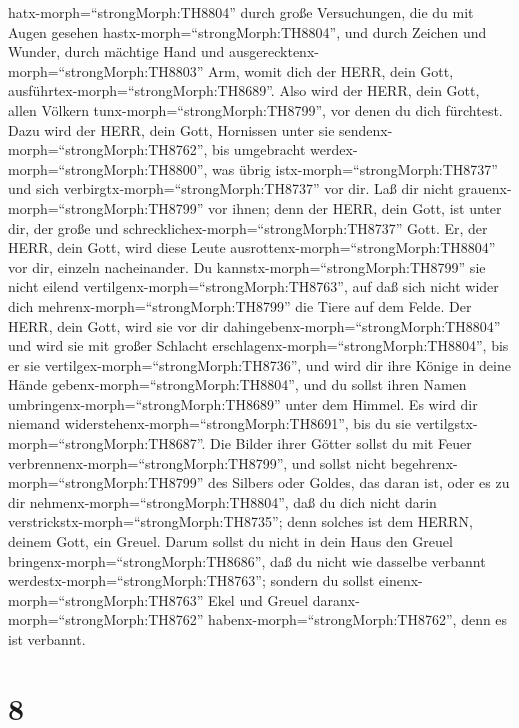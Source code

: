 hatx-morph=``strongMorph:TH8804''  durch große
Versuchungen, die du mit Augen gesehen
hastx-morph=``strongMorph:TH8804'', und durch Zeichen und Wunder, durch
mächtige Hand und ausgerecktenx-morph=``strongMorph:TH8803'' Arm, womit
dich der HERR, dein Gott, ausführtex-morph=``strongMorph:TH8689''. Also
wird der HERR, dein Gott, allen Völkern
tunx-morph=``strongMorph:TH8799'', vor denen du dich fürchtest.
 Dazu wird der HERR, dein Gott, Hornissen unter sie
sendenx-morph=``strongMorph:TH8762'', bis umgebracht
werdex-morph=``strongMorph:TH8800'', was übrig
istx-morph=``strongMorph:TH8737'' und sich
verbirgtx-morph=``strongMorph:TH8737'' vor dir.  Laß dir
nicht grauenx-morph=``strongMorph:TH8799'' vor ihnen; denn der HERR,
dein Gott, ist unter dir, der große und
schrecklichex-morph=``strongMorph:TH8737'' Gott.  Er, der
HERR, dein Gott, wird diese Leute
ausrottenx-morph=``strongMorph:TH8804'' vor dir, einzeln nacheinander.
Du kannstx-morph=``strongMorph:TH8799'' sie nicht eilend
vertilgenx-morph=``strongMorph:TH8763'', auf daß sich nicht wider dich
mehrenx-morph=``strongMorph:TH8799'' die Tiere auf dem Felde.
 Der HERR, dein Gott, wird sie vor dir
dahingebenx-morph=``strongMorph:TH8804'' und wird sie mit großer
Schlacht erschlagenx-morph=``strongMorph:TH8804'', bis er sie
vertilgex-morph=``strongMorph:TH8736'',  und wird dir ihre
Könige in deine Hände gebenx-morph=``strongMorph:TH8804'', und du sollst
ihren Namen umbringenx-morph=``strongMorph:TH8689'' unter dem Himmel. Es
wird dir niemand widerstehenx-morph=``strongMorph:TH8691'', bis du sie
vertilgstx-morph=``strongMorph:TH8687''.  Die Bilder ihrer
Götter sollst du mit Feuer verbrennenx-morph=``strongMorph:TH8799'', und
sollst nicht begehrenx-morph=``strongMorph:TH8799'' des Silbers oder
Goldes, das daran ist, oder es zu dir
nehmenx-morph=``strongMorph:TH8804'', daß du dich nicht darin
verstrickstx-morph=``strongMorph:TH8735''; denn solches ist dem HERRN,
deinem Gott, ein Greuel.  Darum sollst du nicht in dein
Haus den Greuel bringenx-morph=``strongMorph:TH8686'', daß du nicht wie
dasselbe verbannt werdestx-morph=``strongMorph:TH8763''; sondern du
sollst einenx-morph=``strongMorph:TH8763'' Ekel und Greuel
daranx-morph=``strongMorph:TH8762'' habenx-morph=``strongMorph:TH8762'',
denn es ist verbannt.

\hypertarget{section-7}{%
\section{8}\label{section-7}}

